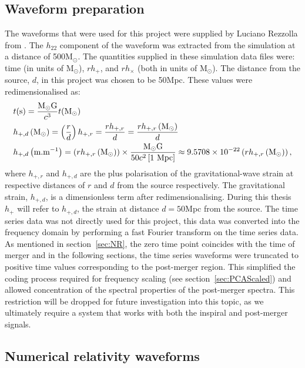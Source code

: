 \subsection{Waveform preparation}
The waveforms that were used for this project were supplied by Luciano Rezzolla from \cite*{Takami2015}. The $h_{22}$ component of the waveform was extracted from the simulation at a distance of 500M$_\odot$. The quantities supplied in these simulation data files were: time (in units of M$_\odot$), $r h_+$, and $r h_\times$ (both in units of M$_\odot$). The distance from the source, $d$, in this project was chosen to be 50Mpc. These values were redimensionalised as:
\begin{align}
& t(\text{s})  =\dfrac{\text{M}_\odot \text{G}}{c^3}t(\text{M}_\odot)\\
& h_{+,d}\left(\text{M}_\odot \right)  =\left(\dfrac{r}{d}\right)h_{+,r} = \dfrac{rh_{+,r}}{d}=\dfrac{rh_{+,r}\left(\text{M}_\odot \right)}{d}\notag \\ 
& h_{+,d}\left(\text{m.m}^{-1}\right)   =\left( rh_{+,r}\left(\text{M}_\odot \right)\right)\times \dfrac{\text{M}_\odot \text{G}}{50 c^2\left[ \text{1 Mpc} \right]}\approx 9.5708\times10^{-22}\left( rh_{+,r}\left(\text{M}_\odot \right)\right),
\end{align}
where $h_{+,r}$ and $h_{+,d}$ are the plus polarisation of the gravitational-wave strain at respective  distances of $r$ and $d$ from the source respectively. The gravitational strain, $h_{+,d}$, is a dimensionless term after redimensionalising. During this thesis $h_{+}$ will refer to $h_{+,d}$, the strain at distance $d=50$Mpc from the source. The time series data was not directly used for this project, this data was converted into the frequency domain by performing a fast Fourier transform on the time series data. As mentioned in section~\ref{sec:NR}, the zero time point coincides with the time of merger and in the following sections, the time series waveforms were truncated to positive time values corresponding to the post-merger region. This simplified the coding process required for frequency scaling (see section~\ref{sec:PCAScaled}) and allowed concentration of the spectral properties of the post-merger spectra. This restriction will be dropped for future investigation into this topic, as we ultimately require a system that works with both the inspiral and post-merger signals.\par
\subsection{Numerical relativity waveforms}

